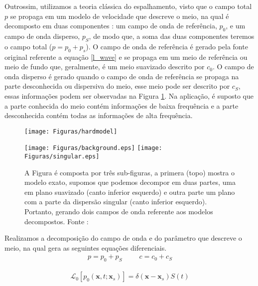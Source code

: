 Outrossim, utilizamos a teoria clássica do espalhamento, visto que o campo total $p$ se propaga em um modelo de velocidade que descreve o meio, na qual é decomposto em duas componentes : um campo de onda de referência, $p_{0}$, e um campo de onda disperso, $p_{S}$, de modo que, a soma das duas componentes teremos o campo total ($p = p_{0} + p_{s}$). O campo de onda de referência é gerado pela fonte original referente a equação \ref{l_wave} e se propaga em um meio de referência ou meio de fundo que, geralmente, é um meio suavizado descrito por $c_{0}$. O campo de onda disperso é gerado quando o campo de onda de referência se propaga na parte desconhecida ou dispersiva do meio, esse meio pode ser descrito por $c_{S}$, essas informações podem ser observadas na Figura \ref{fig:decomposition_model}. Na aplicação, é suposto que a parte conhecida do meio contém informações de baixa frequência e a parte desconhecida contém todas as informações de alta frequência. 

\begin{figure}[h!]
\centering
\centerline{\texttt{[image: Figuras/hardmodel]}}
\centerline{\texttt{[image: Figuras/background.eps]}
\hspace*{0.4cm}
\texttt{[image: Figuras/singular.eps]}}
\caption{A Figura é composta por três sub-figuras, a primera (topo) mostra o modelo exato, supomos que podemos decompor em duas partes, uma em plano suavizado (canto inferior esquerdo) e outra parte um plano com a parte da dispersão singular (canto inferior esquerdo). Portanto, gerando dois campos de onda referente aos modelos decompostos. Fonte : \citet{macedo_2014}}
\label{fig:decomposition_model}
\end{figure}
 
Realizamos a decomposição do campo de onda e do parâmetro que descreve o meio, na qual gera as seguintes equações diferenciais. \\
\begin{eqnarray}
 \nonumber
 p = p_{0} + p_{S} ~~~~~~~~~ ~~ c= c_{0} + c_{S}
\end{eqnarray}

\begin{eqnarray}
\mathcal{L}_{0} \left[p_{0}(\mathbf{x},t;\mathbf{x}_{s}) \right] = \delta(\mathbf{x}-\mathbf{x}_{s}) S(t)
\label{eq_l0}
\end{eqnarray}

